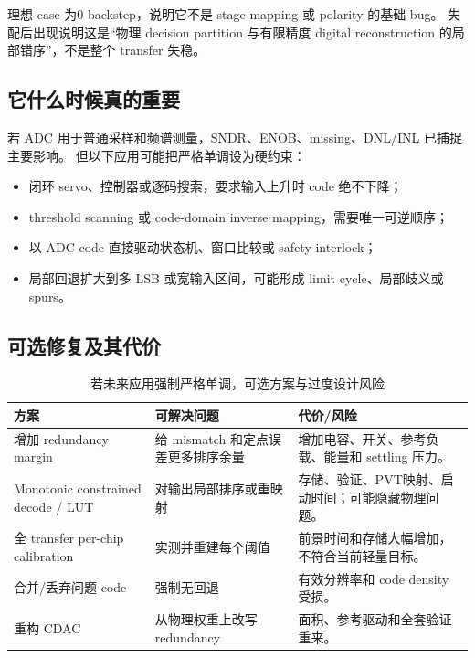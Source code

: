 \documentclass[UTF8,11pt,a4paper]{ctexart}
\newcommand{\tablehead}{\rowcolor{PaleBlue}\bfseries\sffamily\color{DeepNavy}}
\begin{document}
理想 case 为0 backstep，说明它不是 stage mapping 或 polarity 的基础 bug。
失配后出现说明这是“物理 decision partition 与有限精度 digital
reconstruction 的局部错序”，不是整个 transfer 失稳。

\subsection{它什么时候真的重要}

若 ADC 用于普通采样和频谱测量，SNDR、ENOB、missing、DNL/INL 已捕捉主要影响。
但以下应用可能把严格单调设为硬约束：

\begin{itemize}
  \item 闭环 servo、控制器或逐码搜索，要求输入上升时 code 绝不下降；
  \item threshold scanning 或 code-domain inverse mapping，需要唯一可逆顺序；
  \item 以 ADC code 直接驱动状态机、窗口比较或 safety interlock；
  \item 局部回退扩大到多 LSB 或宽输入区间，可能形成 limit cycle、局部歧义或 spurs。
\end{itemize}

\subsection{可选修复及其代价}

\begin{table}[htbp]
  \centering
  \caption{若未来应用强制严格单调，可选方案与过度设计风险}
  \begin{tabularx}{\textwidth}{@{}p{38mm}p{43mm}Y@{}}
    \toprule
    \tablehead 方案 & 可解决问题 & 代价/风险\\
    \midrule
    增加 redundancy margin &
      给 mismatch 和定点误差更多排序余量 &
      增加电容、开关、参考负载、能量和 settling 压力。\\
    Monotonic constrained decode / LUT &
      对输出局部排序或重映射 &
      存储、验证、PVT映射、启动时间；可能隐藏物理问题。\\
    全 transfer per-chip calibration &
      实测并重建每个阈值 &
      前景时间和存储大幅增加，不符合当前轻量目标。\\
    合并/丢弃问题 code &
      强制无回退 &
      有效分辨率和 code density 受损。\\
    重构 CDAC &
      从物理权重上改写 redundancy &
      面积、参考驱动和全套验证重来。\\
    \bottomrule
  \end{tabularx}
\end{table}
\end{document}
